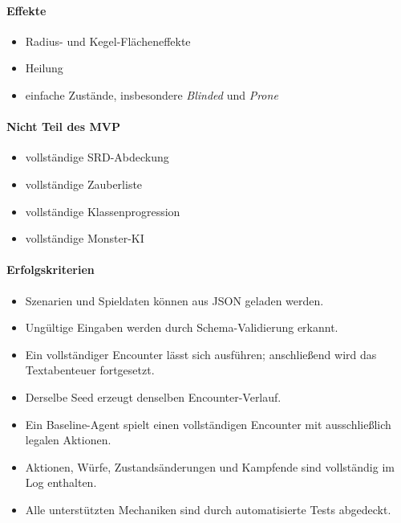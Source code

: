 \documentclass[
  12pt,
  a4paper,
  oneside,
  parskip=half,
  headings=normal
]{scrreprt}
\begin{document}
\paragraph{Effekte}
\begin{itemize}
  \item Radius- und Kegel-Flächeneffekte
  \item Heilung
  \item einfache Zustände, insbesondere \emph{Blinded} und \emph{Prone}
\end{itemize}

\paragraph{Nicht Teil des MVP}
\begin{itemize}
  \item vollständige SRD-Abdeckung
  \item vollständige Zauberliste
  \item vollständige Klassenprogression
  \item vollständige Monster-KI
\end{itemize}

\paragraph{Erfolgskriterien}
\begin{itemize}
  \item Szenarien und Spieldaten können aus JSON geladen werden.
  \item Ungültige Eingaben werden durch Schema-Validierung erkannt.
  \item Ein vollständiger Encounter lässt sich ausführen; anschließend wird
        das Textabenteuer fortgesetzt.
  \item Derselbe Seed erzeugt denselben Encounter-Verlauf.
  \item Ein Baseline-Agent spielt einen vollständigen Encounter mit
        ausschließlich legalen Aktionen.
  \item Aktionen, Würfe, Zustandsänderungen und Kampfende sind vollständig im
        Log enthalten.
  \item Alle unterstützten Mechaniken sind durch automatisierte Tests
        abgedeckt.
\end{itemize}
\end{document}
